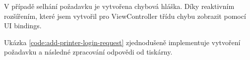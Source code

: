 V případě selhání požadavku je vytvořena chybová hláška.
Díky reaktivním rozšířením, které jsem vytvořil pro ViewController třídu chybu zobrazit pomocí UI bindings.

Ukázka \ref{code:add-printer-login-request} zjednodušeně implementuje vytvoření požadavku a následné zpracování odpovědi od tiskárny.


